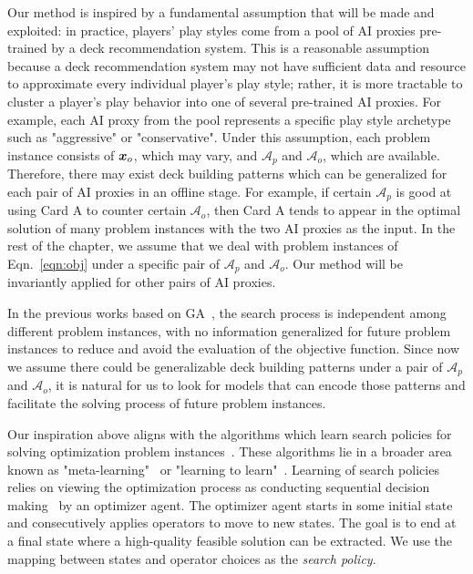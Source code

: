 
Our method is inspired by a fundamental assumption that will be made and exploited: in practice, players' play styles come from a pool of AI proxies pre-trained by a deck recommendation system. This is a reasonable assumption because a deck recommendation system may not have sufficient data and resource to approximate every individual player's play style; rather, it is more tractable to cluster a player's play behavior into one of several pre-trained AI proxies. For example, each AI proxy from the pool represents a specific play style archetype such as "aggressive" or "conservative". Under this assumption, each problem instance consists of $\boldsymbol{x}_o$, which may vary, and $\mathcal{A}_p$ and $\mathcal{A}_o$, which are available. Therefore, there may exist deck building patterns which can be generalized for each pair of AI proxies in an offline stage. For example, if certain $\mathcal{A}_p$ is good at using Card A to counter certain $\mathcal{A}_o$, then Card A tends to appear in the optimal solution of many problem instances with the two AI proxies as the input. In the rest of the chapter, we assume that we deal with problem instances of Eqn.~\ref{eqn:obj} under a specific pair of $\mathcal{A}_p$ and $\mathcal{A}_o$. Our method
will be invariantly applied for other pairs of AI proxies.

In the previous works based on GA~\citep{garcia2016evolutionary,bjorke2017deckbuilding}, the search process is independent among different problem instances, with no information generalized for future problem instances to reduce and avoid the evaluation of the objective function. Since now we assume there could be generalizable deck building patterns under a pair of $\mathcal{A}_p$ and $\mathcal{A}_o$, it is natural for us to look for models that can encode those patterns and facilitate the solving process of future problem instances.

Our inspiration above aligns with the algorithms which learn search policies for solving optimization problem instances~\citep{zoph2016neural,li2017learning,chenlearning,zhang2000solving,bello2016neural}. These algorithms lie in a broader area known as "meta-learning"~\citep{lemke2015metalearning,brazdil2008metalearning,vilalta2002perspective} or "learning to learn"~\citep{thrun2012learning}. Learning of search policies relies on viewing the optimization process as conducting sequential decision making~\citep{littman1996algorithms} by an optimizer agent. The optimizer agent starts in some initial state and consecutively applies operators to move to new states. The goal is to end at a final state where a high-quality feasible solution can be extracted. We use the mapping between states and operator choices as the \textit{search policy}. 

